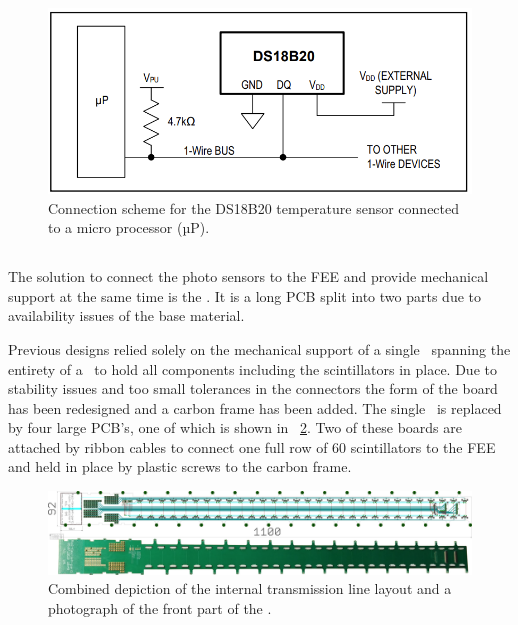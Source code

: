 \documentclass[../BTOF_summary.tex]{subfiles}
\begin{document}
\begin{figure}[htbp]
	\centering
	\includegraphics[width=.6\textwidth]{fig/DS18B20_connection.png}
	\caption[Connection scheme for the DS18B20 temperature sensor.]{Connection scheme for the DS18B20 temperature sensor connected to a micro processor (µP).}
	\label{fig:DS18B20_connection}
\end{figure}



\subsection{\railboard}

The solution to connect the photo sensors to the FEE and provide mechanical support at the same time is the \railboard .
It is a long PCB split into two parts due to availability issues of the base material.

Previous designs relied solely on the mechanical support of a single \railboard\ spanning the entirety of a \sm\ to hold all components including the scintillators in place.
Due to stability issues and too small tolerances in the connectors the form of the board has been redesigned and a carbon frame has been added.
The single \railboard\ is replaced by four large PCB's, one of which is shown in \fig ~\ref{fig:Railboard}.
Two of these boards are attached by ribbon cables to connect one full row of 60 scintillators to the FEE and held in place by plastic screws to the carbon frame.

\begin{figure}[htbp]
	\centering
	\includegraphics*[width=.9\textwidth]{fig/Railboard3_imageCombined.png}
	\caption{Combined depiction of the internal transmission line layout and a photograph of the front part of the \railboard .}
	\label{fig:Railboard}
\end{figure}
\end{document}
